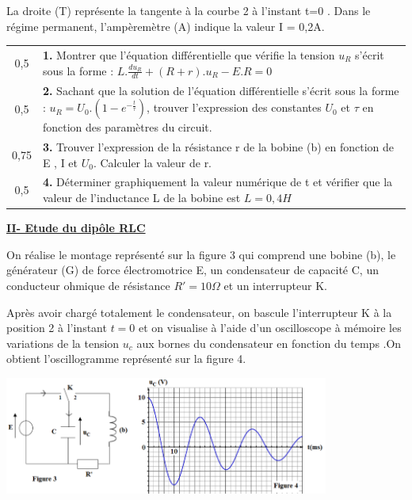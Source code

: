 \documentclass[12pt]{article}
\begin{document}
La droite (T) représente la tangente à la courbe 2 à l’instant t=0 .
Dans le régime permanent, l’ampèremètre (A) indique la valeur I = 0,2A.

\begin{tabular}{c|l}
	0,5  & \makecell[l]{\textbf{1. }Montrer que l’équation différentielle que vérifie la tension $u_R$ s’écrit sous la forme \\: $L.\frac{du_R}{dt} + (R+r).u_R - E.R = 0$}\\
	0,5 & \makecell[l]{\textbf{2. }Sachant que la solution de l’équation différentielle s’écrit sous la forme : $u_R = U_0.(1-e^{-\frac{t}{\tau}})$,\\trouver l’expression des constantes $U_0$ et $\tau$ en fonction des paramètres du circuit.}\\
		0,75 & \makecell[l]{\textbf{3. }Trouver l’expression de la résistance r de la bobine (b) en fonction de E , I et $U_0$. Calculer \\la valeur
de r.}\\
			0,5 & \makecell[l]{\textbf{4. }Déterminer graphiquement la valeur numérique de t et vérifier que la valeur de l’inductance \\L de la
bobine est $L=0,4H$}\\
		\end{tabular}




\textbf{\underline{II- Etude du dipôle RLC}}

On réalise le montage représenté sur la figure 3 qui comprend une bobine (b), le générateur (G) de force électromotrice E, un condensateur de capacité C, un conducteur ohmique de résistance $R' = 10 \Omega$ et un interrupteur K.

Après avoir chargé totalement le condensateur, on bascule l’interrupteur K à la position 2 à l’instant $t = 0$ et on visualise à l’aide d’un oscilloscope à mémoire les variations de la tension $u_c$ aux bornes du
condensateur en fonction du temps .On obtient l’oscillogramme représenté sur la figure 4.

\begin{center}
  \includegraphics[width=0.8\textwidth]{./img/rlc_01.png}
\end{center}
\end{document}
